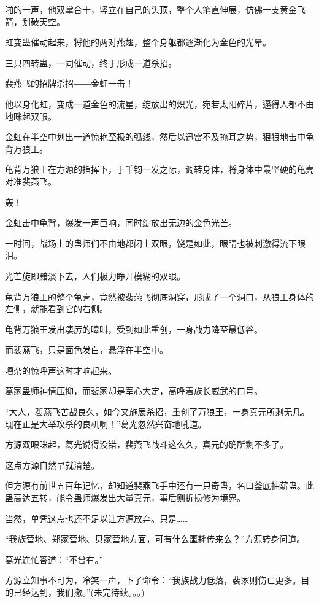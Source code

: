 \begin{this_body}
啪的一声，他双掌合十，竖立在自己的头顶，整个人笔直伸展，仿佛一支黄金飞箭，划破天空。

虹变蛊催动起来，将他的两对燕翅，整个身躯都逐渐化为金色的光晕。

三只四转蛊，一同催动，终于形成一道杀招。

裴燕飞的招牌杀招――金虹一击！

他以身化虹，变成一道金色的流星，绽放出的炽光，宛若太阳碎片，逼得人都不由地眯起双眼。

金虹在半空中划出一道惊艳至极的弧线，然后以迅雷不及掩耳之势，狠狠地击中龟背万狼王。

龟背万狼王在方源的指挥下，于千钧一发之际，调转身体，将身体中最坚硬的龟壳对准裴燕飞。

轰！

金虹击中龟背，爆发一声巨响，同时绽放出无边的金色光芒。

一时间，战场上的蛊师们不由地都闭上双眼，饶是如此，眼睛也被刺激得流下眼泪。

光芒旋即黯淡下去，人们极力睁开模糊的双眼。

龟背万狼王的整个龟壳，竟然被裴燕飞彻底洞穿，形成了一个洞口，从狼王身体的左侧，就能看到它的右侧。

龟背万狼王发出凄厉的嗥叫，受到如此重创，一身战力降至最低谷。

而裴燕飞，只是面色发白，悬浮在半空中。

嘈杂的惊呼声这时才响起来。

葛家蛊师神情压抑，而裴家却是军心大定，高呼着族长威武的口号。

“大人，裴燕飞苦战良久，如今又施展杀招，重创了万狼王，一身真元所剩无几。现在正是大举攻杀的良机啊！”葛光忽然兴奋地吼道。

方源双眼眯起，葛光说得没错，裴燕飞战斗这么久，真元的确所剩不多了。

这点方源自然早就清楚。

但方源有前世五百年记忆，却知道裴燕飞手中还有一只奇蛊，名曰釜底抽薪蛊。此蛊高达五转，能令蛊师爆发出大量真元，事后则折损修为境界。

当然，单凭这点也还不足以让方源放弃。只是……

“我族营地、郑家营地、贝家营地方面，可有什么噩耗传来么？”方源转身问道。

葛光连忙答道：“不曾有。”

方源立知事不可为，冷笑一声，下了命令：“我族战力低落，裴家则伤亡更多。目的已经达到，我们撤。”(未完待续。。。)

\end{this_body}

